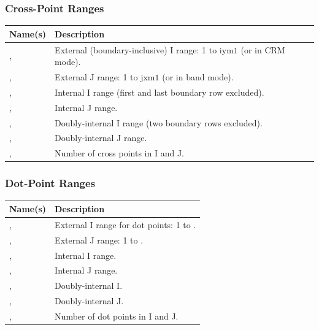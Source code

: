 \subsubsection{Cross-Point Ranges}

\begin{longtable}{L{4cm} L{8cm}}
  \toprule
  \textbf{Name(s)} & \textbf{Description} \\
  \midrule
  \endhead
  \bottomrule
  \endfoot
  ,  & External (boundary-inclusive) I range: 1 to $\text{iym1}$
    (or  in CRM mode). \\
  ,  & External J range: 1 to $\text{jxm1}$
    (or  in band mode). \\
  ,  & Internal I range (first and last boundary row excluded). \\
  ,  & Internal J range. \\
  ,  & Doubly-internal I range (two boundary rows excluded). \\
  ,  & Doubly-internal J range. \\
  ,  & Number of cross points in I and J. \\
\end{longtable}

\subsubsection{Dot-Point Ranges}

\begin{longtable}{L{4cm} L{8cm}}
  \toprule
  \textbf{Name(s)} & \textbf{Description} \\
  \midrule
  \endhead
  \bottomrule
  \endfoot
  ,  & External I range for dot points: 1 to . \\
  ,  & External J range: 1 to . \\
  ,  & Internal I range. \\
  ,  & Internal J range. \\
  ,  & Doubly-internal I. \\
  ,  & Doubly-internal J. \\
  ,  & Number of dot points in I and J. \\
\end{longtable}

